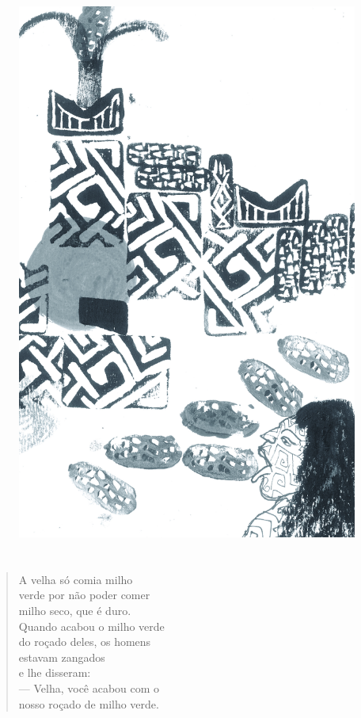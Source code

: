 \pagebreak
\thispagestyle{empty}
\begin{figure}
\vspace*{-1.6cm}
\hspace*{-2.2cm}\includegraphics[width=138mm]{./imgs/img4.jpg}
\end{figure}

\chapter*{}

\mbox{}\vspace*{\fill}

\begin{verse}
A velha só comia milho\\
verde por não poder comer\\
milho seco, que é duro.\\
Quando acabou o milho verde\\
do roçado deles, os homens\\
estavam zangados\\
e lhe disseram:\\
— Velha, você acabou com o\\
nosso roçado de milho verde.\\
\end{verse}

